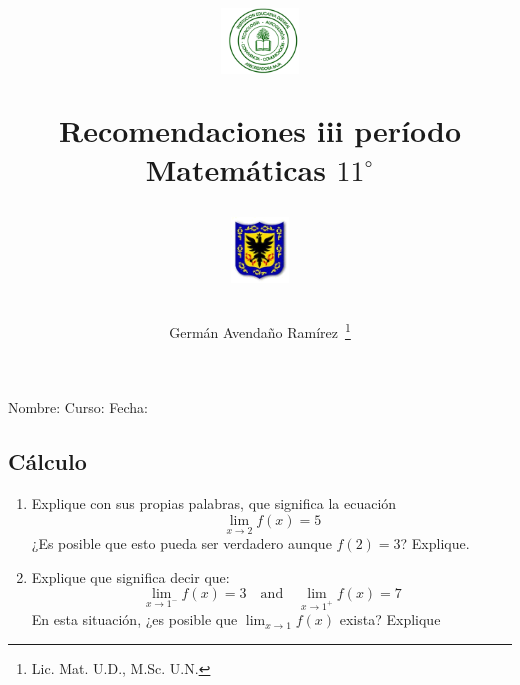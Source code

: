 \documentclass[letterpaper,11pt,twoside]{article}
\author{Germ\'an Avenda\~no Ram\'irez~\thanks{Lic. Mat. U.D., M.Sc. U.N.}}
\title{\begin{minipage}{.2\textwidth}
\includegraphics[height=1.75cm]{Images/logo-colegio.png}\end{minipage}
\begin{minipage}{.55\textwidth}
\begin{center}
Recomendaciones iii período\\
Matemáticas $11^{\circ}$
\end{center}
\end{minipage}\hfill
\begin{minipage}{.2\textwidth}
\includegraphics[height=1.75cm]{Images/logo-sed.png} 
\end{minipage}}
\date{}
\begin{document}
\maketitle
Nombre: \hrulefill Curso: \underline{\hspace*{44pt}} Fecha: \underline{\hspace*{2.5cm}}
\begin{multicols}{2}
\section*{Cálculo}
\begin{enumerate}
\item Explique con sus propias palabras, que significa la ecuación 
\[\displaystyle{\lim_{x\rightarrow 2}f(x)=5}\]
¿Es posible que esto pueda ser verdadero aunque $f(2)=3$? Explique.
\item Explique que significa decir que:
\[\displaystyle{\lim_{x\rightarrow 1^{-}}f(x)=3}\quad \text{and} \quad \displaystyle{\lim_{x \rightarrow 1^{+}}f(x)=7}\]
En esta situación, ¿es posible que $\displaystyle{\lim_{x\rightarrow 1}f(x)}$ exista? Explique


\end{enumerate}
\end{multicols}
\end{document}
